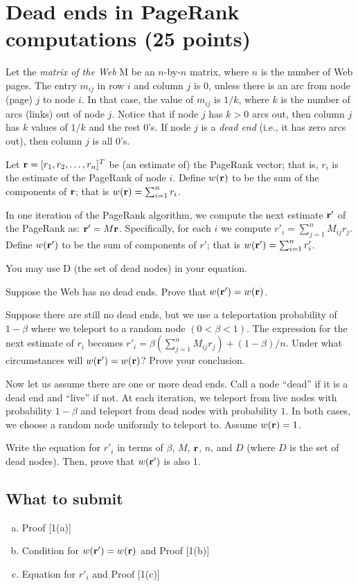 \section{Dead ends in PageRank computations (25 points)}

Let the {\em matrix of the Web} M be an $n$-by-$n$ matrix, where $n$ is the number of Web pages.  The entry $m_{ij}$  in row $i$ and column $j$ is 0, unless there is an arc from node (page) $j$ to node $i$.  In that case, the value of $m_{ij}$ is $1/k$, where $k$ is the number of arcs (links) out of node $j$.  Notice that if node $j$ has $k>0$ arcs out, then column $j$ has $k$ values of $1/k$ and the rest 0's.  If node $j$ is a {\em dead end} (i.e., it has zero arcs out), then column $j$ is all 0's.

\def\bfr{{\bf r}}

Let $\bfr = [r_1,r_2,\ldots,r_n]^T$ be (an estimate of) the PageRank vector; that is, $r_i$ is the estimate of the PageRank of node $i$.  Define $w(\bfr)$ to be the sum of the components of $\bfr$; that is $w(\bfr) = \sum_{i=1}^n r_i$.

In one iteration of the PageRank algorithm, we compute the next estimate $\bfr'$ of the PageRank as: $\bfr' = M\bfr$.  Specifically, for each $i$ we compute $r'_i = \sum_{j=1}^n M_{ij}  r_j$. Define $w(\bfr')$ to be the sum of components of $r'$; that is $w(\bfr') = \sum_{i=1}^n r_i'$.

You may use D (the set of dead nodes) in your equation.

 Suppose the Web has no dead ends.  Prove that $w(\bfr') = w(\bfr)$.

 Suppose there are still no dead ends, but we use a teleportation probability of $1-\beta$ where we teleport to a random node $(0<\beta<1)$.  The expression for the next estimate of $r_i$ becomes
$r'_i = \beta (\sum_{j=1}^n M_{ij} r_j) + (1-\beta)/n$.
Under what circumstances will $w(\bfr') = w(\bfr)$?  Prove your conclusion.

 Now let us assume there are one or more dead ends. Call a node ``dead'' if it is a dead end and ``live'' if not. 
At each iteration, we teleport from live nodes with probability $1-\beta$ and teleport from dead nodes with probability $1$. In both cases, we choose a random node uniformly to teleport to. Assume $w(\bfr) = 1$.

Write the equation for $r'_i$ in terms of $\beta$, $M$, $\bfr$, $n$, and $D$ (where $D$ is the set of dead nodes).
Then, prove that $w(\bfr')$ is also 1.

\subsection*{What to submit}
\begin{enumerate}[(a)]
\item Proof [1(a)]
\item Condition for $w(\bfr') = w(\bfr)$ and Proof [1(b)]
\item Equation for $r'_i$ and Proof [1(c)]
\end{enumerate}

